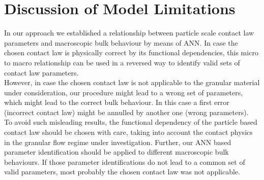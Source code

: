 



\section{Discussion of Model Limitations}
\label{sec:discussion}
In our approach we established a relationship between particle scale contact law
parameters and macroscopic bulk behaviour by means of \acs{ANN}. 
In case the chosen contact law is physically correct by its functional dependencies, 
this micro to macro relationship can be used in a reversed way to identify 
valid sets of contact law parameters.\\
However, in case the chosen contact law is not applicable to the granular 
material under consideration, 
our procedure might lead to a wrong set of parameters, which might lead to the
correct bulk behaviour.
In this case a first error (incorrect contact law) might be annulled by another
one (wrong parameters).\\
To avoid such misleading results, the functional dependency of the particle based contact 
law should be chosen with care, taking into account the contact physics in the granular 
flow regime under investigation. 
Further, our \acs{ANN} based parameter
identification should be applied to different macroscopic bulk behaviours. 
If those parameter identifications do not 
lead to a common set of valid parameters, most probably the chosen contact law was not applicable. 